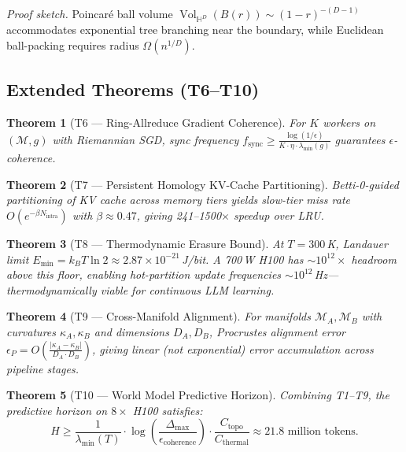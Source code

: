 \documentclass[11pt, a4paper]{article}
\theoremstyle{proofform}
\numberwithin{innerpoints}{subsection}
\numberwithin{disproof}{subsection}
\theoremstyle{mathproof}
\newtheorem{theorem}{Theorem}
\begin{document}
\textit{Proof sketch.} Poincar\'e ball volume $\operatorname{Vol}_{\mathbb{H}^D}(B(r)) \sim (1-r)^{-(D-1)}$ accommodates exponential tree branching near the boundary, while Euclidean ball-packing requires radius $\Omega(n^{1/D})$.

\subsection{Extended Theorems (T6--T10)}

\begin{theorem}[T6 --- Ring-Allreduce Gradient Coherence]
For $K$ workers on $(\mathcal{M}, g)$ with Riemannian SGD, sync frequency $f_{\text{sync}} \geq \frac{\log(1/\epsilon)}{K \cdot \eta \cdot \lambda_{\min}(g)}$ guarantees $\epsilon$-coherence.
\end{theorem}

\begin{theorem}[T7 --- Persistent Homology KV-Cache Partitioning]
Betti-0-guided partitioning of KV cache across memory tiers yields slow-tier miss rate $O(e^{-\beta N_{\text{intra}}})$ with $\beta \approx 0.47$, giving 241--1500$\times$ speedup over LRU.
\end{theorem}

\begin{theorem}[T8 --- Thermodynamic Erasure Bound]
At $T = 300$\,K, Landauer limit $E_{\min} = k_B T \ln 2 \approx 2.87 \times 10^{-21}$\,J/bit. A 700\,W H100 has $\sim$$10^{12}\times$ headroom above this floor, enabling hot-partition update frequencies $\sim$$10^{12}$\,Hz---thermodynamically viable for continuous LLM learning.
\end{theorem}

\begin{theorem}[T9 --- Cross-Manifold Alignment]
For manifolds $\mathcal{M}_A, \mathcal{M}_B$ with curvatures $\kappa_A, \kappa_B$ and dimensions $D_A, D_B$, Procrustes alignment error $\epsilon_P = O\left(\frac{|\kappa_A - \kappa_B|}{D_A \cdot D_B}\right)$, giving \textit{linear} (not exponential) error accumulation across pipeline stages.
\end{theorem}

\begin{theorem}[T10 --- World Model Predictive Horizon]
Combining T1--T9, the predictive horizon on $8 \times$ H100 satisfies:
\[
H \geq \frac{1}{\lambda_{\min}(T)} \cdot \log\!\left(\frac{\Delta_{\max}}{\epsilon_{\text{coherence}}}\right) \cdot \frac{C_{\text{topo}}}{C_{\text{thermal}}} \approx 21.8 \text{ million tokens.}
\]
\end{theorem}
\end{document}
